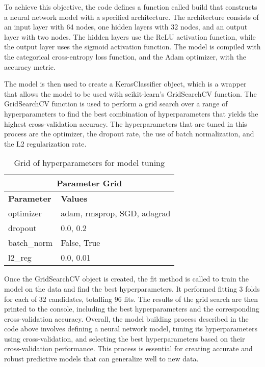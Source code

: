 \documentclass[12pt,a4paper,oneside]{article}
\begin{document}
	
	To achieve this objective, the code defines a function called build that constructs a neural network model with a specified architecture. The architecture consists of an input layer with 64 nodes, one hidden layers with 32 nodes, and an output layer with two nodes. The hidden layers use the ReLU activation function, while the output layer uses the sigmoid activation function. The model is compiled with the categorical cross-entropy loss function, and the Adam optimizer, with the accuracy metric.
	
	The model is then used to create a KerasClassifier object, which is a wrapper that allows the model to be used with scikit-learn's GridSearchCV\cite{grid} function. The GridSearchCV function is used to perform a grid search over a range of hyperparameters to find the best combination of hyperparameters that yields the highest cross-validation accuracy. The hyperparameters that are tuned in this process are the optimizer, the dropout rate, the use of batch normalization, and the L2 regularization rate.
	
	
	\begin{table}[h]
	\centering
	\begin{tabular}{|l|l|}
		\hline
		\multicolumn{2}{|c|}{\textbf{Parameter Grid}} \\ \hline
		\textbf{Parameter} & \textbf{Values} \\ \hline
		optimizer & adam, rmsprop, SGD, adagrad \\
		dropout & 0.0, 0.2 \\
		batch\_norm & False, True \\
		l2\_reg & 0.0, 0.01 \\ \hline
	\end{tabular}
	\caption{Grid of hyperparameters for model tuning}
	\label{tab:param-grid}
\end{table}
	
	Once the GridSearchCV object is created, the fit method is called to train the model on the data and find the best hyperparameters. It performed fitting 3 folds for each of 32 candidates, totalling 96 fits. The results of the grid search are then printed to the console, including the best hyperparameters and the corresponding cross-validation accuracy. Overall, the model building process described in the code above involves defining a neural network model, tuning its hyperparameters using cross-validation, and selecting the best hyperparameters based on their cross-validation performance. This process is essential for creating accurate and robust predictive models that can generalize well to new data.	
	
\end{document}

